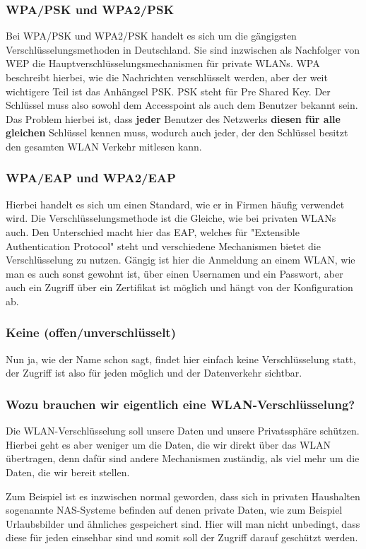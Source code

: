 \subsubsection{WPA/PSK und WPA2/PSK}
Bei WPA/PSK und WPA2/PSK handelt es sich um die gängigsten 
Verschlüsselungsmethoden in Deutschland. Sie sind inzwischen als Nachfolger von 
WEP die Hauptverschlüsselungsmechanismen für private WLANs. WPA beschreibt 
hierbei, wie die Nachrichten verschlüsselt werden, aber der weit wichtigere 
Teil ist das Anhängsel PSK. PSK steht für Pre Shared Key. Der Schlüssel muss 
also sowohl dem Accesspoint als auch dem Benutzer bekannt sein. Das Problem 
hierbei ist, dass \textbf{jeder} Benutzer des Netzwerks \textbf{diesen für alle gleichen} 
Schlüssel kennen muss, wodurch auch jeder, der den Schlüssel besitzt den 
gesamten WLAN Verkehr mitlesen kann.

\subsubsection{WPA/EAP und WPA2/EAP}
Hierbei handelt es sich um einen Standard, wie er in Firmen häufig verwendet 
wird. Die Verschlüsselungsmethode ist die Gleiche, wie bei privaten WLANs auch. 
Den Unterschied macht hier das EAP, welches für "Extensible Authentication 
Protocol" steht und verschiedene Mechanismen bietet die Verschlüsselung zu 
nutzen. Gängig ist hier die Anmeldung an einem WLAN, wie man es auch sonst 
gewohnt ist, über einen Usernamen und ein Passwort, aber auch ein Zugriff über 
ein Zertifikat ist möglich und hängt von der Konfiguration ab. 
 
\subsubsection{Keine (offen/unverschlüsselt)}
Nun ja, wie der Name schon sagt, findet hier einfach keine Verschlüsselung 
statt, der Zugriff ist also für jeden möglich und der Datenverkehr sichtbar.

\subsubsection{Wozu brauchen wir eigentlich eine WLAN-Verschlüsselung?}
Die WLAN-Verschlüsselung soll unsere Daten und unsere Privatssphäre schützen. 
Hierbei geht es aber weniger um die Daten, die wir direkt über das WLAN 
übertragen, denn dafür sind andere Mechanismen zuständig, als viel mehr um die 
Daten, die wir bereit stellen. 

Zum Beispiel ist es inzwischen normal geworden, dass sich in privaten Haushalten 
sogenannte NAS-Systeme befinden auf denen private Daten, wie zum Beispiel 
Urlaubsbilder und ähnliches gespeichert sind. Hier will man nicht unbedingt, dass diese 
für jeden einsehbar sind und somit soll der Zugriff darauf geschützt werden. 

